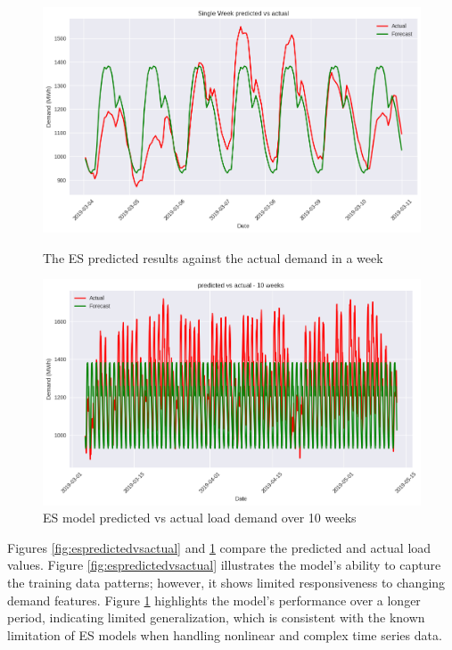 \begin{figure}[h]
	\begin{minipage}[b]{0.45\linewidth}
	\centering
	\includegraphics[width=\linewidth]{Chapters/images/results/ES_predicted_vs_actual}
	\caption{The ES predicted results against the actual demand in a week}
	\label{fig:espredictedvsactual}
\end{minipage}
\hfill
\begin{minipage}[b]{0.45\linewidth}
	\centering
	\includegraphics[width=\linewidth]{Chapters/images/results/ES_predicted_vs_actual_10weeks}
	\caption{ES model predicted vs actual load demand over 10 weeks}
	\label{fig:espredictedvsactual10weeks}
	
\end{minipage}
\end{figure}
 Figures \ref{fig:espredictedvsactual} and \ref{fig:espredictedvsactual10weeks} compare the predicted and actual load values. Figure \ref{fig:espredictedvsactual} illustrates the model’s ability to capture the training data patterns; however, it shows limited responsiveness to changing demand features. Figure \ref{fig:espredictedvsactual10weeks} highlights the model’s performance over a longer period, indicating limited generalization, which is consistent with the known limitation of ES models when handling nonlinear and complex time series data.
 

